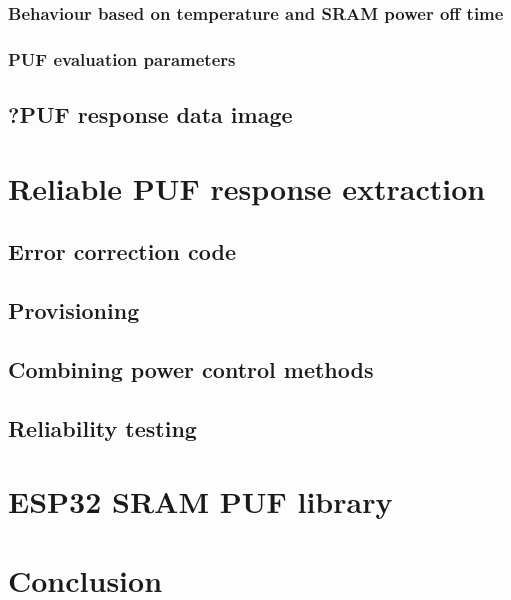 \subsection{Behaviour based on temperature and SRAM power off time}
\subsection{PUF evaluation parameters}

\section{?PUF response data image} %

\chapter{Reliable PUF response extraction} %

\section{Error correction code}

\section{Provisioning}

\section{Combining power control methods}

\section{Reliability testing}

\chapter{ESP32 SRAM PUF library}

\chapter{Conclusion}

